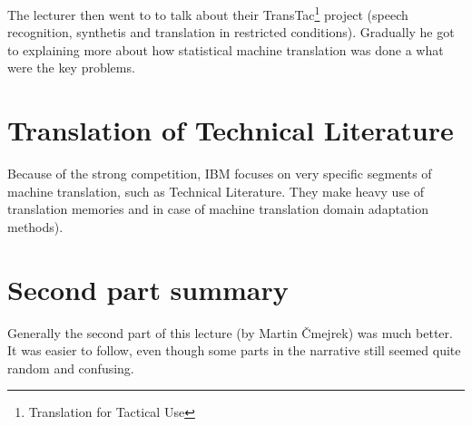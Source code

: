 \documentclass[a4paper]{article}
\begin{document}
The lecturer then went to to talk about their TransTac\footnote{Translation for Tactical Use} project (speech recognition, synthetis and translation in restricted conditions). Gradually he got to explaining more about how statistical machine translation was done a what were the key problems.

\section*{Translation of Technical Literature}
Because of the strong competition, IBM focuses on very specific segments of machine translation, such as Technical Literature. They make heavy use of translation memories and in case of machine translation domain adaptation methods).

\section*{Second part summary}
Generally the second part of this lecture (by Martin Čmejrek) was much better. It was easier to follow, even though some parts in the narrative still seemed quite random and confusing.
\end{document}

